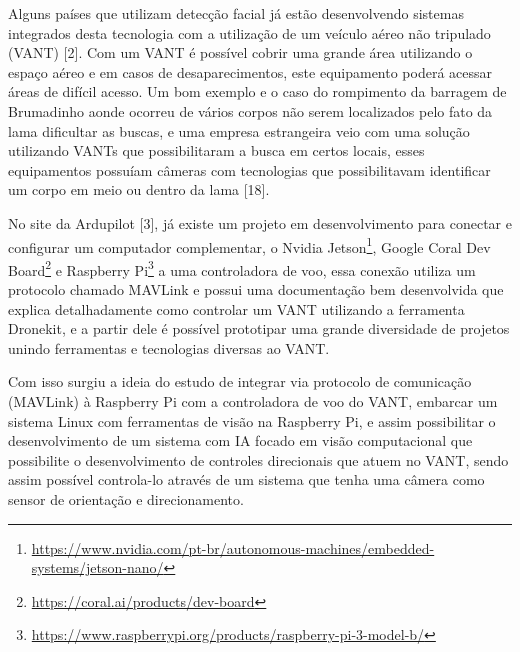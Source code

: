 Alguns países que utilizam detecção facial já estão desenvolvendo sistemas integrados desta tecnologia com a utilização de um veículo aéreo não tripulado (VANT) \cite{dois} [2]. Com um VANT é possível cobrir uma grande área utilizando o espaço aéreo e em casos de desaparecimentos, este equipamento poderá acessar áreas de difícil acesso. Um bom exemplo e o caso do rompimento da barragem de Brumadinho aonde ocorreu de vários corpos não serem localizados pelo fato da lama dificultar as buscas, e uma empresa estrangeira veio com uma solução utilizando VANTs que possibilitaram a busca em certos locais, esses equipamentos possuíam câmeras com tecnologias que possibilitavam identificar um corpo em meio ou dentro da lama [18].  


No site da Ardupilot \cite{tres}[3], já existe um projeto em desenvolvimento para conectar e configurar um computador complementar,  o Nvidia Jetson\footnote{\url{https://www.nvidia.com/pt-br/autonomous-machines/embedded-systems/jetson-nano/}}, Google Coral Dev Board\footnote{\url{https://coral.ai/products/dev-board}} e Raspberry Pi\footnote{\url{https://www.raspberrypi.org/products/raspberry-pi-3-model-b/}} a uma controladora de voo, essa conexão utiliza um protocolo chamado MAVLink e possui uma documentação bem desenvolvida que explica detalhadamente como controlar um VANT utilizando a ferramenta Dronekit, e a partir dele é possível prototipar uma grande diversidade de projetos unindo ferramentas e tecnologias diversas ao VANT.

Com isso surgiu a ideia do estudo de integrar via protocolo de comunicação (MAVLink) à Raspberry Pi com a controladora de voo do VANT, embarcar um sistema Linux com ferramentas de visão na Raspberry Pi, e assim possibilitar o desenvolvimento de um sistema com IA focado em visão computacional que possibilite o desenvolvimento de controles direcionais que atuem no VANT, sendo assim possível controla-lo através de um sistema que tenha uma câmera como sensor de orientação e direcionamento.  






